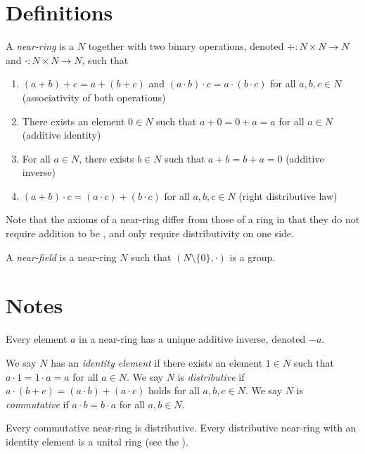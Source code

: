 \documentclass[12pt]{article}
\begin{document}

\section*{Definitions}

A \emph{near-ring} is a  $N$ together with two binary operations, denoted $+\colon N \times N \to N$ and $\cdot\colon N \times N \to N$, such that
\begin{enumerate}
\item $(a+b)+c = a+(b+c)$ and $(a \cdot b) \cdot c = a \cdot (b \cdot c)$ for all $a,b,c \in N$ (associativity of both operations)
\item There exists an element $0 \in N$ such that $a+0 = 0+a = a$ for all $a \in N$ (additive identity)
\item For all $a \in N$, there exists $b \in N$ such that $a+b = b+a = 0$ (additive inverse)
\item $(a+b) \cdot c = (a \cdot c) + (b \cdot c)$ for all $a,b,c \in N$ (right distributive law)
\end{enumerate}

Note that the axioms of a near-ring differ from those of a ring in that they do not require addition to be , and only require distributivity on one side.

A \emph{near-field} is a near-ring $N$
such that $(N\setminus\{0\},\cdot)$ is a group.

\section*{Notes}

Every element $a$ in a near-ring has a unique additive inverse, denoted $-a$.

We say $N$ has an {\em identity element} if there exists an element $1 \in N$ such that $a \cdot 1 = 1 \cdot a = a$ for all $a \in N$.
We say $N$ is {\em distributive} if $a\cdot(b+c) = (a \cdot b) + (a \cdot c)$ holds for all $a,b,c \in N$.
We say $N$ is {\em commutative} if $a \cdot b = b \cdot a$ for all $a,b \in N$.

Every commutative near-ring is distributive.
Every distributive near-ring with an identity element is a unital ring
(see the ).
\end{document}
